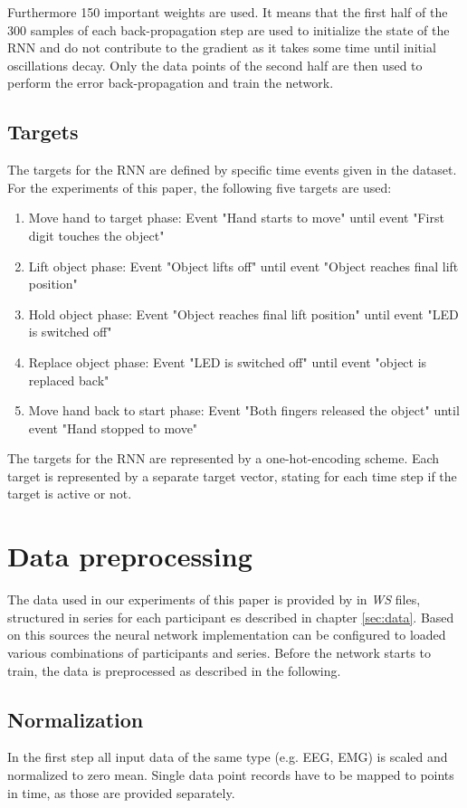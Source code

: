 \documentclass{article} %
\begin{document}
Furthermore 150 important weights are used. It means that the first half of the 300 samples of each back-propagation step are used to initialize the state of the RNN and do not contribute to the gradient as it takes some time until initial oscillations decay. Only the data points of the second half are then used to perform the error back-propagation and train the network.

\subsection{Targets}
The targets for the RNN are defined by specific time events given in the dataset. For the experiments of this paper, the following five targets are used:
\begin{enumerate}
	\item Move hand to target phase: Event "Hand starts to move"  until event "First digit touches the object"
	\item Lift object phase: Event "Object lifts off" until event "Object reaches final lift position"
	\item Hold object phase: Event "Object reaches final lift position" until event "LED is switched off"
	\item Replace object phase: Event "LED is switched off" until event "object is replaced back"
	\item Move hand back to start phase: Event "Both fingers released the object" until event "Hand stopped to move"
\end{enumerate}
The targets for the RNN are represented by a one-hot-encoding scheme. Each target is represented by a separate target vector, stating for each time step if the target is active or not.



\section{Data preprocessing}
The data used in our experiments of this paper is provided by \cite{nature} in \textit{WS} files, structured in series for each participant es described in chapter \ref{sec:data}. Based on this sources the neural network implementation can be configured to loaded various combinations of participants and series. Before the network starts to train, the data is preprocessed as described in the following.

\subsection{Normalization}
In the first step all input data of the same type (e.g. EEG, EMG) is scaled and normalized to zero mean. Single data point records have to be mapped to points in time, as those are provided separately.
\end{document}
